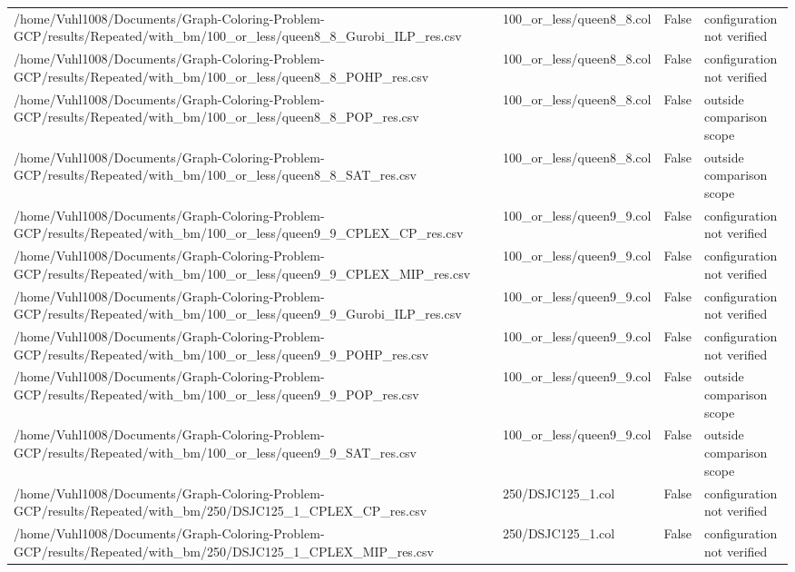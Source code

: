 \begin{table}[htbp]
\begin{tabular}{llll}
/home/Vuhl1008/Documents/Graph-Coloring-Problem-GCP/results/Repeated/with\_bm/100\_or\_less/queen8\_8\_Gurobi\_ILP\_res.csv & 100\_or\_less/queen8\_8.col & False & configuration not verified \\
/home/Vuhl1008/Documents/Graph-Coloring-Problem-GCP/results/Repeated/with\_bm/100\_or\_less/queen8\_8\_POHP\_res.csv & 100\_or\_less/queen8\_8.col & False & configuration not verified \\
/home/Vuhl1008/Documents/Graph-Coloring-Problem-GCP/results/Repeated/with\_bm/100\_or\_less/queen8\_8\_POP\_res.csv & 100\_or\_less/queen8\_8.col & False & outside comparison scope \\
/home/Vuhl1008/Documents/Graph-Coloring-Problem-GCP/results/Repeated/with\_bm/100\_or\_less/queen8\_8\_SAT\_res.csv & 100\_or\_less/queen8\_8.col & False & outside comparison scope \\
/home/Vuhl1008/Documents/Graph-Coloring-Problem-GCP/results/Repeated/with\_bm/100\_or\_less/queen9\_9\_CPLEX\_CP\_res.csv & 100\_or\_less/queen9\_9.col & False & configuration not verified \\
/home/Vuhl1008/Documents/Graph-Coloring-Problem-GCP/results/Repeated/with\_bm/100\_or\_less/queen9\_9\_CPLEX\_MIP\_res.csv & 100\_or\_less/queen9\_9.col & False & configuration not verified \\
/home/Vuhl1008/Documents/Graph-Coloring-Problem-GCP/results/Repeated/with\_bm/100\_or\_less/queen9\_9\_Gurobi\_ILP\_res.csv & 100\_or\_less/queen9\_9.col & False & configuration not verified \\
/home/Vuhl1008/Documents/Graph-Coloring-Problem-GCP/results/Repeated/with\_bm/100\_or\_less/queen9\_9\_POHP\_res.csv & 100\_or\_less/queen9\_9.col & False & configuration not verified \\
/home/Vuhl1008/Documents/Graph-Coloring-Problem-GCP/results/Repeated/with\_bm/100\_or\_less/queen9\_9\_POP\_res.csv & 100\_or\_less/queen9\_9.col & False & outside comparison scope \\
/home/Vuhl1008/Documents/Graph-Coloring-Problem-GCP/results/Repeated/with\_bm/100\_or\_less/queen9\_9\_SAT\_res.csv & 100\_or\_less/queen9\_9.col & False & outside comparison scope \\
/home/Vuhl1008/Documents/Graph-Coloring-Problem-GCP/results/Repeated/with\_bm/250/DSJC125\_1\_CPLEX\_CP\_res.csv & 250/DSJC125\_1.col & False & configuration not verified \\
/home/Vuhl1008/Documents/Graph-Coloring-Problem-GCP/results/Repeated/with\_bm/250/DSJC125\_1\_CPLEX\_MIP\_res.csv & 250/DSJC125\_1.col & False & configuration not verified \\

\end{tabular}
\end{table}
